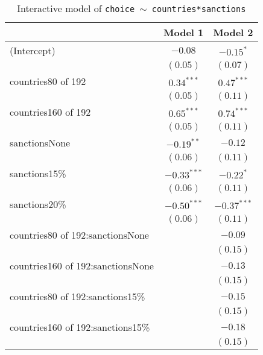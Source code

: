 \documentclass[12pt,letterpaper]{article}
\begin{document}
\begin{enumerate}
\begin{enumerate}
		\begin{table}[h!]
	\caption{Interactive model of \texttt{choice $\sim$ countries*sanctions}}
	\vspace{.25cm}
	\label{table:coefficients2}
	\centering
\begin{adjustbox}{width=.475\textwidth}
\begin{tabular}{l c c}
\hline
 & Model 1 & Model 2 \\
\hline
(Intercept)                       & $-0.08$       & $-0.15^{*}$   \\
                                  & $(0.05)$      & $(0.07)$      \\
countries80 of 192                & $0.34^{***}$  & $0.47^{***}$  \\
                                  & $(0.05)$      & $(0.11)$      \\
countries160 of 192               & $0.65^{***}$  & $0.74^{***}$  \\
                                  & $(0.05)$      & $(0.11)$      \\
sanctionsNone                     & $-0.19^{**}$  & $-0.12$       \\
                                  & $(0.06)$      & $(0.11)$      \\
sanctions15\%                     & $-0.33^{***}$ & $-0.22^{*}$   \\
                                  & $(0.06)$      & $(0.11)$      \\
sanctions20\%                     & $-0.50^{***}$ & $-0.37^{***}$ \\
                                  & $(0.06)$      & $(0.11)$      \\
countries80 of 192:sanctionsNone  &               & $-0.09$       \\
                                  &               & $(0.15)$      \\
countries160 of 192:sanctionsNone &               & $-0.13$       \\
                                  &               & $(0.15)$      \\
countries80 of 192:sanctions15\%  &               & $-0.15$       \\
                                  &               & $(0.15)$      \\
countries160 of 192:sanctions15\% &               & $-0.18$       \\
                                  &               & $(0.15)$      \\

\end{tabular}
\end{adjustbox}
\end{table}
\end{enumerate}
\end{enumerate}
\end{document}

